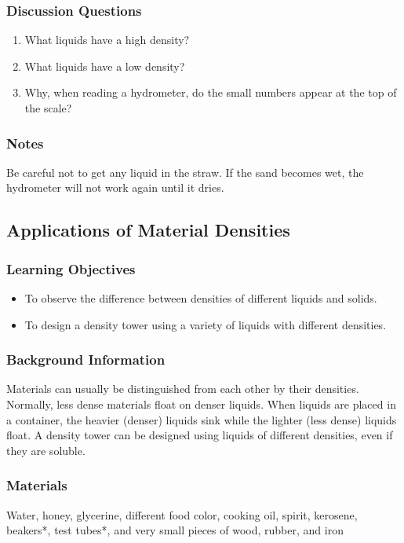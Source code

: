 \subsubsection*{Discussion Questions}
\begin{enumerate}
\item{What liquids have a high density?}
\item{What liquids have a low density?}
\item{Why, when reading a hydrometer, do the small numbers appear at the top of the scale?}
\end{enumerate}

\subsubsection*{Notes}
Be careful not to get any liquid in the straw. If the sand becomes wet, the hydrometer will not work again until it dries.  

\subsection{Applications of Material Densities}

\subsubsection*{Learning Objectives}
\begin{itemize}
\item{To observe the difference between densities of different liquids and solids.} 
\item{To design a density tower using a variety of liquids with different densities.} 
\end{itemize}

\subsubsection*{Background Information}
Materials can usually be distinguished from each other by their densities.  Normally, less dense materials float on denser liquids.  When liquids are placed in a container, the heavier (denser) liquids sink while the lighter (less dense) liquids float.  A density tower can be designed using liquids of different densities, even if they are soluble.

\subsubsection*{Materials}
Water, honey, glycerine, different food color, cooking oil, spirit, kerosene, beakers*, test tubes*, and very small pieces of wood, rubber, and iron

